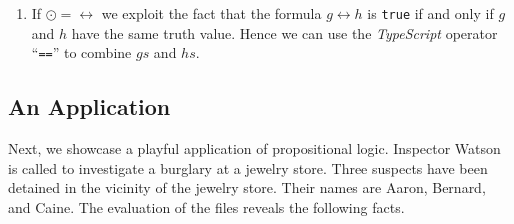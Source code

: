 \begin{enumerate}
\begin{enumerate}
            $\texttt{evaluate}(g, I) \leq \texttt{evaluate}(h, I)$.
            \\[0.2cm]
            Hence we combine $gs$ and $hs$ using the \emph{less-or-equal} operator ``\texttt{<=}''.
      \item If $\odot = \leftrightarrow$ we exploit the fact that the formula $g \leftrightarrow h$ is \texttt{true} if and
            only if $g$ and $h$ have the same truth value.  Hence we
            can use the \textsl{TypeScript} operator ``\texttt{==}''
            to combine $gs$ and $hs$.
      \end{enumerate}
\end{enumerate}

\subsection{An Application}
Next, we showcase a playful application of propositional logic.  Inspector Watson is called to investigate a
burglary at a jewelry store.  Three suspects have been detained in the vicinity of the jewelry store.
Their names are Aaron, Bernard, and Caine.  The evaluation of the files reveals the following facts.
